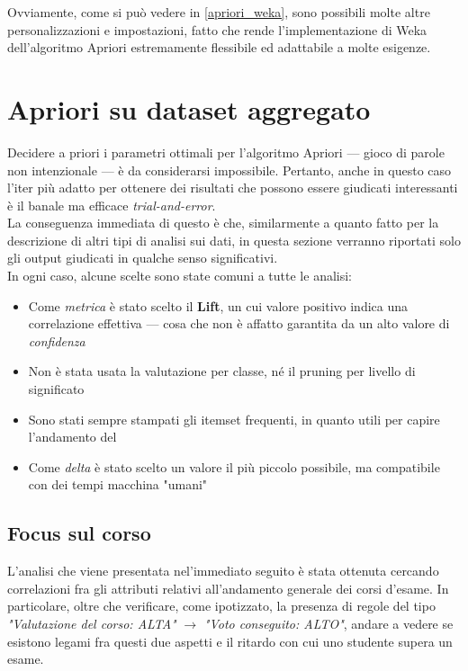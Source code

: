         Ovviamente, come si può vedere in \ref{apriori_weka}, sono possibili molte altre personalizzazioni e impostazioni, fatto che rende l'implementazione di Weka dell'algoritmo Apriori estremamente flessibile ed adattabile a molte esigenze. \\
 
\section{Apriori su dataset aggregato}

    Decidere a priori i parametri ottimali per l'algoritmo Apriori --- \footnotesize{gioco di parole non intenzionale }\normalsize --- è da considerarsi impossibile. Pertanto, anche in questo caso l'iter più adatto per ottenere dei risultati che possono essere giudicati interessanti è il banale ma efficace \textit{trial-and-error}. \\

    La conseguenza immediata di questo è che, similarmente a quanto fatto per la descrizione di altri tipi di analisi sui dati, in questa sezione verranno riportati solo gli output giudicati in qualche senso significativi. \\

    In ogni caso, alcune scelte sono state comuni a tutte le analisi:

    \begin{itemize}
        \item Come \textit{metrica} è stato scelto il \textbf{Lift}, un cui valore positivo indica una correlazione effettiva --- cosa che non è affatto garantita da un alto valore di \textit{confidenza}
        \item Non è stata usata la valutazione per classe, né il pruning per livello di significato
        \item Sono stati sempre stampati gli itemset frequenti, in quanto utili per capire l'andamento del 
        \item Come \textit{delta} è stato scelto un valore il più piccolo possibile, ma compatibile con dei tempi macchina "umani"
    \end{itemize}

        \subsection{Focus sul corso}

            L'analisi che viene presentata nel'immediato seguito è stata ottenuta cercando correlazioni fra gli attributi relativi all'andamento generale dei corsi d'esame. In particolare, oltre che verificare, come ipotizzato, la presenza di regole del tipo \textit{"Valutazione del corso: ALTA"} $\rightarrow$ \textit{"Voto conseguito: ALTO"}, andare a vedere se esistono legami fra questi due aspetti e il ritardo con cui uno studente supera un esame. \\

